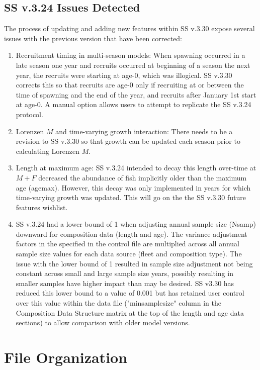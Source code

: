 \subsection{SS v.3.24 Issues Detected}
The process of updating and adding new features within SS v.3.30 expose several issues with the previous version that have been corrected:
\begin{enumerate}
	\item Recruitment timing in multi-season models: When spawning occurred in a late season one year and recruits occurred at beginning of a season the next year, the recruits were starting at age-0, which was illogical.  SS v.3.30 corrects this so that recruits are age-0 only if recruiting at or between the time of spawning and the end of the year, and recruits after January 1st start at age-0.  A manual option allows users to attempt to replicate the SS v.3.24 protocol.
	\item Lorenzen $M$ and time-varying growth interaction: There needs to be a revision to SS v.3.30 so that growth can be updated each season prior to calculating Lorenzen $M$.
	\item Length at maximum age: SS v.3.24 intended to decay this length over-time at $M + F$ decreased the abundance of fish implicitly older than the maximum age (agemax).  However, this decay was only implemented in years for which time-varying growth was updated.  This will go on the the SS v.3.30 future features wishlist.
	\item SS v.3.24 had a lower bound of 1 when adjusting annual sample size (Nsamp) downward for composition data (length and age).  The variance adjustment factors in the specified in the control file are multiplied across all annual sample size values for each data source (fleet and composition type).  The issue with the lower bound of 1 resulted in sample size adjustment not being constant across small and large sample size years, possibly resulting in smaller samples have higher impact than may be desired.  SS v3.30 has reduced this lower bound to a value of 0.001 but has retained user control over this value within the data file ("minsamplesize" column in the Composition Data Structure matrix at the top of the length and age data sections) to allow comparison with older model versions. 
\end{enumerate}

		
\section{File Organization}\label{FileOrganization}		
